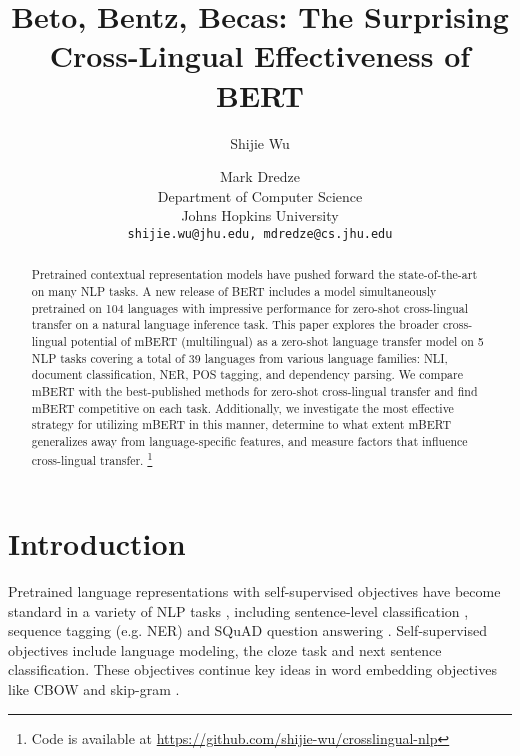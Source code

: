 \documentclass[11pt,a4paper]{article}
\title{Beto, Bentz, Becas: The Surprising Cross-Lingual Effectiveness of BERT}
\author{Shijie Wu \and Mark Dredze \\
Department of Computer Science \\
Johns Hopkins University \\
{\tt shijie.wu@jhu.edu, mdredze@cs.jhu.edu}
}
\date{}
\newcommand\blfootnote[1]{\begingroup
  \renewcommand\thefootnote{}\footnote{#1}\addtocounter{footnote}{-1}\endgroup
}
\begin{document}
\maketitle
\begin{abstract}
Pretrained contextual representation models \cite{peters-etal-2018-deep,devlin-etal-2019-bert} have pushed forward the state-of-the-art on many NLP tasks. A new release of BERT \cite{multilingualBERTmd} includes a model simultaneously pretrained on 104 languages with impressive performance for zero-shot cross-lingual transfer on a natural language inference task. This paper explores the broader cross-lingual potential of mBERT (multilingual) as a zero-shot language transfer model on 5 NLP tasks covering a total of 39 languages from various language families: NLI, document classification, NER, POS tagging, and dependency parsing. We compare mBERT with the best-published methods for zero-shot cross-lingual transfer and find mBERT competitive on each task.
Additionally, we investigate the most effective strategy for utilizing mBERT in this manner, determine to what extent mBERT generalizes away from language-specific features, and measure factors that influence cross-lingual transfer.\blfootnote{Code is available at \url{https://github.com/shijie-wu/crosslingual-nlp}}


\end{abstract}

\section{Introduction}

Pretrained language representations with self-supervised objectives have become standard in a variety of NLP tasks \cite{peters-etal-2018-deep,howard-ruder-2018-universal,radford2018improving,devlin-etal-2019-bert}, including sentence-level classification \cite{wang-etal-2018-glue}, sequence tagging (e.g. NER) \cite{tjong-kim-sang-de-meulder-2003-introduction} and SQuAD question answering \cite{rajpurkar-etal-2016-squad}. Self-supervised objectives include language modeling, the cloze task \cite{taylor1953cloze} and next sentence classification. These objectives continue key ideas in word embedding objectives like CBOW and skip-gram \cite{mikolov2013efficient}. 
\end{document}
